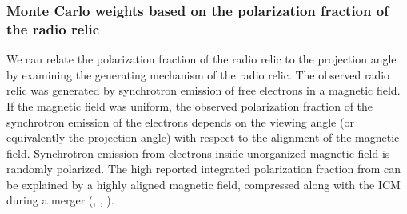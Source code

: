 \documentclass[letterpaper,useAMS,usenatbib]{mn2e}
\begin{document}

\subsubsection{Monte Carlo weights based on the polarization fraction of the radio relic}
\label{subsubsec:polar_frac}

We can relate the polarization fraction of the radio relic to the
projection angle by examining the
generating mechanism of the radio relic.
The observed radio relic was generated by synchrotron emission of free electrons in a
magnetic field. If the magnetic field was uniform, the observed
polarization fraction of the synchrotron emission of the electrons depends on the
viewing angle (or equivalently the projection angle) with respect to the
alignment of the magnetic field. Synchrotron emission from electrons inside
unorganized magnetic field is
randomly polarized. The high reported integrated polarization fraction from
\citet{L13} can be explained by a highly aligned magnetic field,
compressed along with the ICM during a merger
(\citealt{E98}, \citealt{vanWeeren10}, \citealt{Feretti12}).
\par
\end{document}
